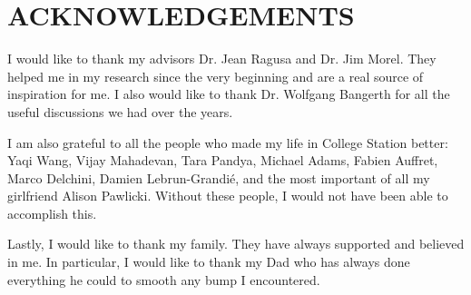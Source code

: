 \chapter*{ACKNOWLEDGEMENTS}
\indent I would like to thank my advisors Dr. Jean Ragusa and Dr. Jim Morel. 
They helped me in my research since the very beginning and are a real
source of inspiration for me. I also would like to thank Dr. Wolfgang Bangerth 
for all the useful discussions we had over the years.

\indent I am also grateful to all the people who made my life in College
Station better: Yaqi Wang, Vijay Mahadevan, Tara Pandya, Michael Adams, Fabien
Auffret, Marco Delchini, Damien Lebrun-Grandi\'e, and the most important of all
my girlfriend Alison Pawlicki. Without these people, I would not have been
able to accomplish this. 

\indent Lastly, I would like to thank my family. They have always supported and
believed in me. In particular, I would like to thank my Dad who has always
done everything he could to smooth any bump I encountered.
\pagebreak{}
